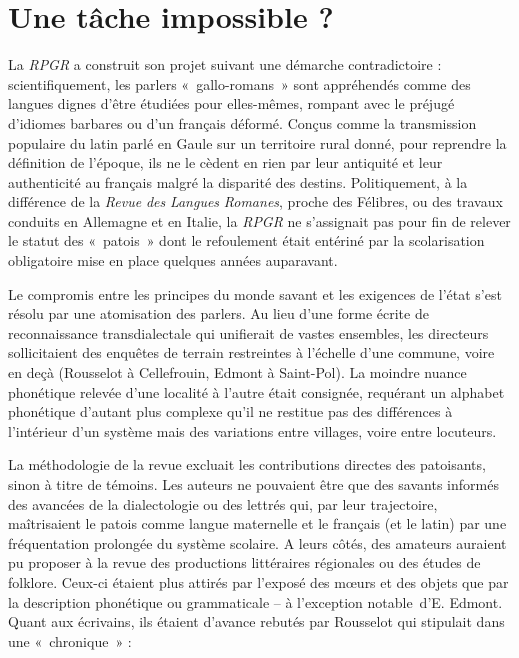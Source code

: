 \documentclass[output=paper]{langsci/langscibook}
\begin{document}
\section{Une tâche impossible ?}

La \textit{RPGR} a construit son projet suivant une démarche contradictoire : scientifiquement, les parlers «~gallo-romans~» sont appréhendés comme des langues dignes d’être étudiées pour elles-mêmes, rompant avec le préjugé d’idiomes barbares ou d’un français déformé. Conçus comme la transmission populaire du latin parlé en Gaule sur un territoire rural donné, pour reprendre la définition de l’époque, ils ne le cèdent en rien par leur antiquité et leur authenticité au français malgré la disparité des destins. Politiquement, à la différence de la \textit{Revue} \textit{des} \textit{Langues} \textit{Romanes}, proche des Félibres, ou des travaux conduits en Allemagne et en Italie, la \textit{RPGR} ne s’assignait pas pour fin de relever le statut des «~patois~» dont le refoulement était entériné par la scolarisation obligatoire mise en place quelques années auparavant. 

Le compromis entre les principes du monde savant et les exigences de l’état s’est résolu par une atomisation des parlers. Au lieu d’une forme écrite de reconnaissance transdialectale qui unifierait de vastes ensembles, les directeurs sollicitaient des enquêtes de terrain restreintes à l’échelle d’une commune, voire en deçà (Rousselot à Cellefrouin, Edmont à Saint-Pol). La moindre nuance phonétique relevée d’une localité à l’autre était consignée, requérant un alphabet phonétique d’autant plus complexe qu’il ne restitue pas des différences à l’intérieur d’un système mais des variations entre villages, voire entre locuteurs.

La méthodologie de la revue excluait les contributions directes des patoisants, sinon à titre de témoins. Les auteurs ne pouvaient être que des savants informés des avancées de la dialectologie ou des lettrés qui, par leur trajectoire, maîtrisaient le patois comme langue maternelle et le français (et le latin) par une fréquentation prolongée du système scolaire. A leurs côtés, des amateurs auraient pu proposer à la revue des productions littéraires régionales ou des études de folklore. Ceux-ci étaient plus attirés par l’exposé des mœurs et des objets que par la description phonétique ou grammaticale – à l’exception notable~d’E. Edmont. Quant aux écrivains, ils étaient d’avance rebutés par Rousselot qui stipulait dans une «~chronique~» :
\end{document}
